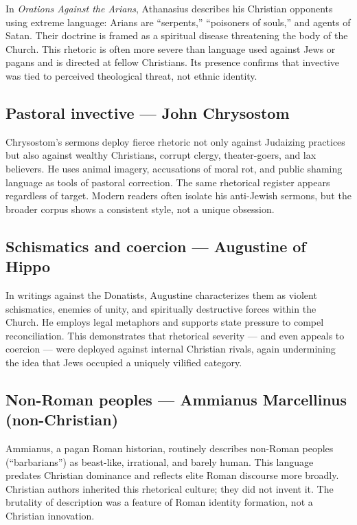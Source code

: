 \documentclass[10pt,twoside,openany]{book}
\begin{document}
In \emph{Orations Against the Arians}, Athanasius describes his Christian
opponents using extreme language: Arians are ``serpents,'' ``poisoners of
souls,'' and agents of Satan. Their doctrine is framed as a spiritual
disease threatening the body of the Church. This rhetoric is often more
severe than language used against Jews or pagans and is directed at
fellow Christians. Its presence confirms that invective was tied to
perceived theological threat, not ethnic identity.

\subsection{Pastoral invective --- John Chrysostom}

Chrysostom's sermons deploy fierce rhetoric not only against Judaizing
practices but also against wealthy Christians, corrupt clergy,
theater-goers, and lax believers. He uses animal imagery, accusations
of moral rot, and public shaming language as tools of pastoral
correction. The same rhetorical register appears regardless of target.
Modern readers often isolate his anti-Jewish sermons, but the broader
corpus shows a consistent style, not a unique obsession.

\subsection{Schismatics and coercion --- Augustine of Hippo}

In writings against the Donatists, Augustine characterizes them as
violent schismatics, enemies of unity, and spiritually destructive
forces within the Church. He employs legal metaphors and supports state
pressure to compel reconciliation. This demonstrates that rhetorical
severity --- and even appeals to coercion --- were deployed against
internal Christian rivals, again undermining the idea that Jews
occupied a uniquely vilified category.

\subsection{Non-Roman peoples --- Ammianus Marcellinus (non-Christian)}

Ammianus, a pagan Roman historian, routinely describes non-Roman
peoples (``barbarians'') as beast-like, irrational, and barely human.
This language predates Christian dominance and reflects elite Roman
discourse more broadly. Christian authors inherited this rhetorical
culture; they did not invent it. The brutality of description was a
feature of Roman identity formation, not a Christian innovation.
\end{document}
